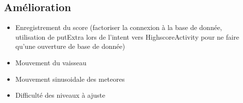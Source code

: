 \documentclass{article}
\begin{document}
\subsection{Amélioration}
\begin{itemize}
    \item Enregistrement du score (factoriser la connexion à la base de donnée, utilisation de putExtra lors de l'intent vers HighscoreActivity pour ne faire qu'une ouverture de base de donnée)
    \item Mouvement du vaisseau
    \item Mouvement sinusoidale des meteores
    \item Difficulté des niveaux à ajuste
\end{itemize}




\nocite{*}
\end{document}
